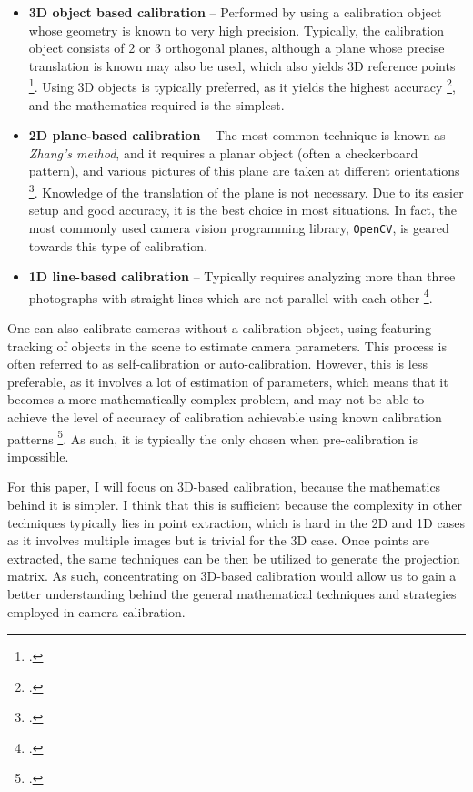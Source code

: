 \begin{itemize}[leftmargin=!, itemindent=-4ex]
    \item \textbf{3D object based calibration} -- Performed by using a calibration object whose geometry is known to very high precision. Typically, the calibration object consists of 2 or 3 orthogonal planes, although a plane whose precise translation is known may also be used, which also yields 3D reference points \footcite{zhangCameraCalibration2007}. Using 3D objects is typically preferred, as it yields the highest accuracy \footcite{zhangCameraCalibration2007}, and the mathematics required is the simplest.
    \item \textbf{2D plane-based calibration} -- The most common technique is known as \emph{Zhang's method}, and it requires a planar object (often a checkerboard pattern), and various pictures of this plane are taken at different orientations \footcite{zhangFlexibleNew2000}. Knowledge of the translation of the plane is not necessary. Due to its easier setup and good accuracy, it is the best choice in most situations. In fact, the most commonly used camera vision programming library, \texttt{OpenCV}, is geared towards this type of calibration. 
    \item \textbf{1D line-based calibration} -- Typically requires analyzing more than three photographs with straight lines which are not parallel with each other \footcite{chuLineBasedCamera2005}. 
\end{itemize}

One can also calibrate cameras without a calibration object, using featuring tracking of objects in the scene to estimate camera parameters. This process is often referred to as self-calibration or auto-calibration. However, this is less preferable, as it involves a lot of estimation of parameters, which means that it becomes a more mathematically complex problem, and may not be able to achieve the level of accuracy of calibration achievable using known calibration patterns \footcite{zhangCameraCalibration2007}. As such, it is typically the only chosen when pre-calibration is impossible. 

For this paper, I will focus on 3D-based calibration, because the mathematics behind it is simpler. I think that this is sufficient because the complexity in other techniques typically lies in point extraction, which is hard in the 2D and 1D cases as it involves multiple images but is trivial for the 3D case. Once points are extracted, the same techniques can be then be utilized to generate the projection matrix. As such, concentrating on 3D-based calibration would allow us to gain a better understanding behind the general mathematical techniques and strategies employed in camera calibration.
